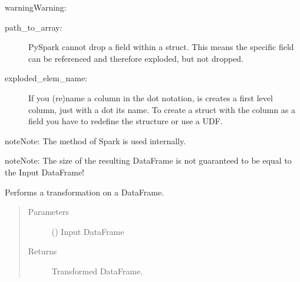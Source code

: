 \documentclass[a4paper,10pt, twoside,english]{sphinxmanual}
\begin{document}
\begin{fulllineitems}
\begin{quote}
\begin{description}
\begin{itemize}
\end{itemize}

\end{description}\end{quote}

\begin{sphinxadmonition}{warning}{Warning:}
\begin{description}
\item[{path\_to\_array:}] \leavevmode
PySpark cannot drop a field within a struct. This means the specific field
can be referenced and therefore exploded, but not dropped.

\item[{exploded\_elem\_name:}] \leavevmode
If you (re)name a column in the dot notation, is creates a first level column,
just with a dot its name. To create a struct with the column as a field
you have to redefine the structure or use a UDF.

\end{description}
\end{sphinxadmonition}

\begin{sphinxadmonition}{note}{Note:}
The  method of Spark is used internally.
\end{sphinxadmonition}

\begin{sphinxadmonition}{note}{Note:}
The size of the resulting DataFrame is not guaranteed to be
equal to the Input DataFrame!
\end{sphinxadmonition}

\begin{fulllineitems}
\label{\detokenize{transformer/exploder:spooq2.transformer.exploder.Exploder.transform}}
Performs a transformation on a DataFrame.
\begin{quote}\begin{description}
\item[{Parameters}] \leavevmode
{} () \textendash{} Input DataFrame

\item[{Returns}] \leavevmode
Transformed DataFrame.


\end{description}
\end{quote}
\end{fulllineitems}
\end{fulllineitems}
\end{document}
